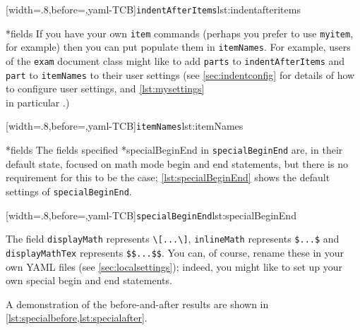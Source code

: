  \begin{cmhtcbraster}[raster columns=3,
   raster left skip=-3.5cm,
   raster right skip=-2cm,
   raster column skip=.03\linewidth]
  [width=.8\linewidth,before=\centering,yaml-TCB]{\texttt{indentAfterItems}}{lst:indentafteritems}
 \end{cmhtcbraster}

*{fields}
 If you have your own \texttt{item} commands (perhaps you prefer to use \texttt{myitem},
 for example) then you can put populate them in \texttt{itemNames}. For example, users of
 the \texttt{exam} document class might like to add \texttt{parts} to
 \texttt{indentAfterItems} and \texttt{part} to \texttt{itemNames} to their user settings
 (see \vref{sec:indentconfig} for details of how to configure user settings, and
 \vref{lst:mysettings} \\ in particular \label{page:examsettings}.)

 [width=.8\linewidth,before=\centering,yaml-TCB]{\texttt{itemNames}}{lst:itemNames}

*{fields}\label{yaml:specialBeginEnd}
 The fields specified 
 *{specialBeginEnd} in \texttt{specialBeginEnd} are, in their default
 state, focused on math mode begin and end statements, but there is no requirement for
 this to be the case; \cref{lst:specialBeginEnd} shows the default settings of
 \texttt{specialBeginEnd}. %

 [width=.8\linewidth,before=\centering,yaml-TCB]{\texttt{specialBeginEnd}}{lst:specialBeginEnd}

 The field \texttt{displayMath} represents \lstinline!\[...\]!, \texttt{inlineMath}
 represents \lstinline!$...$! and \texttt{displayMathTex} represents \lstinline!$$...$$!.
 You can, of course, rename these in your own YAML files (see \vref{sec:localsettings});
 indeed, you might like to set up your own special begin and end statements.

 \begin{example}
 A demonstration of the before-and-after results are shown in
 \cref{lst:specialbefore,lst:specialafter}.

 \begin{cmhtcbraster}
 \end{cmhtcbraster}
 \end{example}

